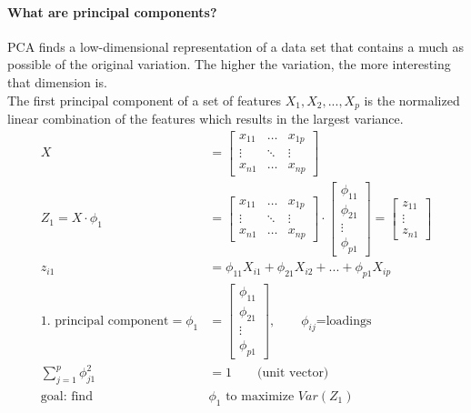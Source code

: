\documentclass[../document.tex]{subfiles}
\begin{document}
	\paragraph{What are principal components?}
	PCA finds a low-dimensional representation of a data set that contains a much as possible of the original variation. The higher the variation, the more interesting that dimension is.\\
	The first principal component of a set of features \(X_{1},X_{2},...,X_{p}\) is the normalized linear combination of the features which results in the largest variance.
	\begin{equation}
	\begin{split}
		X&=\left[\begin{matrix}
			x_{11} & \dots & x_{1p}\\
			\vdots &\ddots& \vdots\\
			x_{n1} & \dots & x_{np}
			\end{matrix}\right]\\
		Z_{1}=X \cdot \phi_1 &= \left[\begin{matrix}
			x_{11} & \dots & x_{1p}\\
			\vdots &\ddots& \vdots\\
			x_{n1} & \dots & x_{np}
			\end{matrix}\right] \cdot \left[\begin{matrix}
				\phi_{11}\\
				\phi_{21}\\
				\vdots\\
				\phi_{p1}
			\end{matrix}\right]
		= \left[\begin{matrix}
			z_{11}\\
			\vdots\\
			z_{n1}
			\end{matrix}\right]\\
		z_{i1}&=\phi_{11}X_{i1}+\phi_{21}X_{i2}+...+\phi_{p1}X_{ip}\\
		\text{1. principal component} = \phi_{1} &= \left[\begin{matrix}
			\phi_{11}\\
			\phi_{21}\\
			\vdots\\
			\phi_{p1}
		\end{matrix}\right], \qquad \phi_{ij}\text{=loadings}\\
		\sum_{j=1}^{p}\phi_{j1}^2&=1 \qquad \text{(unit vector)}\\
		\text{goal: find } &\phi_1 \text{ to maximize }Var(Z_1)\\
	\end{split}
	\end{equation}
\end{document}
